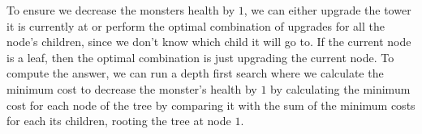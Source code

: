 To ensure we decrease the monsters health by $1$, we can either upgrade the tower it is currently at or perform the optimal combination of upgrades for all the node's children, since we don't know which child it will go to. If the current node is a leaf, then the optimal combination is just upgrading the current node. To compute the answer, we can run a depth first search where we calculate the minimum cost to decrease the monster's health by $1$ by calculating the minimum cost for each node of the tree by comparing it with the sum of the minimum costs for each its children, rooting the tree at node $1$.
